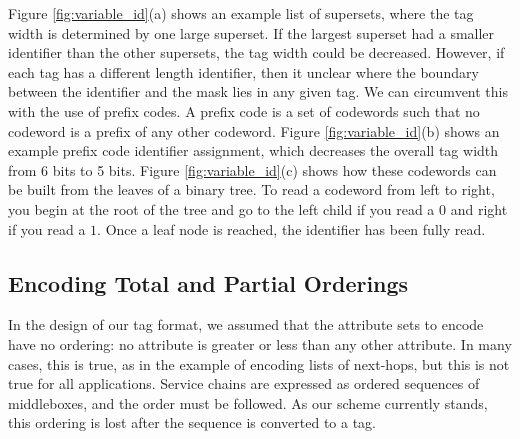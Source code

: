 Figure \ref{fig:variable_id}(a) shows an example list of supersets, where the tag width is determined by one large superset. If the largest superset had a smaller identifier than the other supersets, the tag width could be decreased. However, if each tag has a different length identifier, then it unclear where the boundary between the identifier and the mask lies in any given tag. We can circumvent this with the use of prefix codes. A prefix code is a set of codewords such that no codeword is a prefix of any other codeword. Figure \ref{fig:variable_id}(b) shows an example prefix code identifier assignment, which decreases the overall tag width from 6 bits to 5 bits. Figure \ref{fig:variable_id}(c) shows how these codewords can be built from the leaves of a binary tree. To read a codeword from left to right, you begin at the root of the tree and go to the left child if you read a $0$ and right if you read a $1$. Once a leaf node is reached, the identifier has been fully read.


\subsection{Encoding Total and Partial Orderings}
In the design of our tag format, we assumed that the attribute sets to encode have no ordering: no attribute is greater or less than any other attribute. In many cases, this is true, as in the example of encoding lists of next-hops, but this is not true for all applications. Service chains are expressed as ordered sequences of middleboxes, and the order must be followed. As our scheme currently stands, this ordering is lost after the sequence is converted to a tag. 

